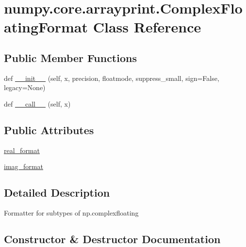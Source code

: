 \hypertarget{classnumpy_1_1core_1_1arrayprint_1_1ComplexFloatingFormat}{}\section{numpy.\+core.\+arrayprint.\+Complex\+Floating\+Format Class Reference}
\label{classnumpy_1_1core_1_1arrayprint_1_1ComplexFloatingFormat}
\subsection*{Public Member Functions}
\begin{DoxyCompactItemize}
\item 
def \hyperlink{classnumpy_1_1core_1_1arrayprint_1_1ComplexFloatingFormat_a4017c5fbcf55e06d9a9c6bbeeb6ed88f}{\+\_\+\+\_\+init\+\_\+\+\_\+} (self, x, precision, floatmode, suppress\+\_\+small, sign=False, legacy=None)
\item 
def \hyperlink{classnumpy_1_1core_1_1arrayprint_1_1ComplexFloatingFormat_a6bb0b7becc9f0b4a9e0c0f5509a2c31e}{\+\_\+\+\_\+call\+\_\+\+\_\+} (self, x)
\end{DoxyCompactItemize}
\subsection*{Public Attributes}
\begin{DoxyCompactItemize}
\item 
\hyperlink{classnumpy_1_1core_1_1arrayprint_1_1ComplexFloatingFormat_a997f83d88459bce70561027ba3d98a0d}{real\+\_\+format}
\item 
\hyperlink{classnumpy_1_1core_1_1arrayprint_1_1ComplexFloatingFormat_a63c7c7d9f82642ad84b058f65acc08ac}{imag\+\_\+format}
\end{DoxyCompactItemize}


\subsection{Detailed Description}
\begin{DoxyVerb}Formatter for subtypes of np.complexfloating \end{DoxyVerb}
 

\subsection{Constructor \& Destructor Documentation}
\mbox{\label{classnumpy_1_1core_1_1arrayprint_1_1ComplexFloatingFormat_a4017c5fbcf55e06d9a9c6bbeeb6ed88f}} 
